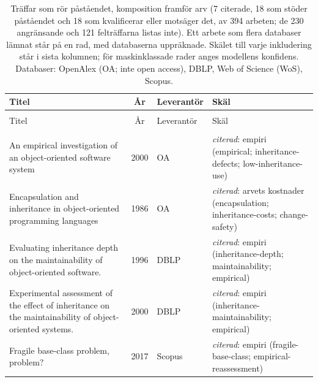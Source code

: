 
\begingroup\footnotesize
\begin{longtable}{@{}%
  >{\raggedright\arraybackslash}p{}c%
  >{\raggedright\arraybackslash}p{}%
  >{\raggedright\arraybackslash}p{}@{}}
\caption{Träffar som rör påståendet, komposition framför arv (7 citerade, 18 som stöder påståendet och 18 som kvalificerar eller motsäger det, av 394 arbeten; de 230 angränsande och 121 felträffarna listas inte).  Ett arbete som flera databaser lämnat står på en rad, med databaserna uppräknade. Skälet till varje inkludering står i sista kolumnen; för maskinklassade rader anges modellens konfidens. Databaser: OpenAlex (OA; inte open access), DBLP, Web of Science (WoS), Scopus.}\label{tab:sok-komposition}\\
\toprule
Titel & År & Leverantör & Skäl \\
\midrule
\endfirsthead
\multicolumn{4}{@{}l}{\emph{\tablename~\thetable{} (forts.)}}\\
\toprule
Titel & År & Leverantör & Skäl \\
\midrule
\endhead
\midrule \multicolumn{4}{r@{}}{\emph{forts.\ på nästa sida}}\\
\endfoot
\bottomrule
\endlastfoot
An empirical investigation of an object-oriented software system & 2000 & OA & \emph{citerad}: empiri (empirical; inheritance-defects; low-inheritance-use) \\
Encapsulation and inheritance in object-oriented programming languages & 1986 & OA & \emph{citerad}: arvets kostnader (encapsulation; inheritance-costs; change-safety) \\
Evaluating inheritance depth on the maintainability of object-oriented software. & 1996 & DBLP & \emph{citerad}: empiri (inheritance-depth; maintainability; empirical) \\
Experimental assessment of the effect of inheritance on the maintainability of object-oriented systems. & 2000 & DBLP & \emph{citerad}: empiri (inheritance-maintainability; empirical) \\
Fragile base-class problem, problem? & 2017 & Scopus & \emph{citerad}: empiri (fragile-base-class; empirical-reassessment) \\

\end{longtable}
